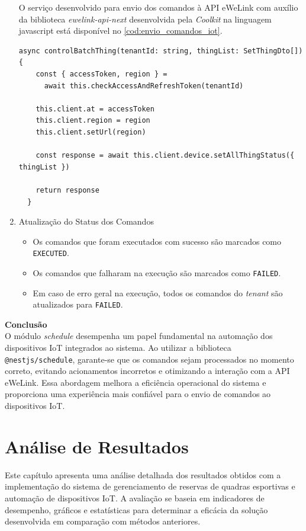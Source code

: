 \begin{enumerate}
  O serviço desenvolvido para envio dos comandos à \acrshort{API} eWeLink com auxílio da biblioteca \textit{ewelink-api-next} desenvolvida pela \textit{Coolkit} na linguagem javascript está disponível no \autoref{cod:envio_comandos_iot}.

  \begin{lstlisting}[caption={Serviço para envio de comandos IoT à \acrshort{API} eWeLink.},label={cod:envio_comandos_iot}]
    async controlBatchThing(tenantId: string, thingList: SetThingDto[]) {
    const { accessToken, region } =
      await this.checkAccessAndRefreshToken(tenantId)

    this.client.at = accessToken
    this.client.region = region
    this.client.setUrl(region)

    const response = await this.client.device.setAllThingStatus({ thingList })

    return response
  }
  \end{lstlisting}
  
  \item Atualização do Status dos Comandos
  \begin{itemize}
      \item Os comandos que foram executados com sucesso são marcados como \texttt{EXECUTED}.
      \item Os comandos que falharam na execução são marcados como \texttt{FAILED}.
      \item Em caso de erro geral na execução, todos os comandos do \textit{tenant} são atualizados para \texttt{FAILED}.
  \end{itemize}
\end{enumerate}

\textbf{Conclusão}\\
O módulo \textit{schedule} desempenha um papel fundamental na automação dos dispositivos IoT integrados ao sistema. Ao utilizar a biblioteca \texttt{@nestjs/schedule}, garante-se que os comandos sejam processados no momento correto, evitando acionamentos incorretos e otimizando a interação com a API eWeLink. Essa abordagem melhora a eficiência operacional do sistema e proporciona uma experiência mais confiável para o envio de comandos ao dispositivos IoT.

\section{Análise de Resultados}\label{sec:analise_resultados}

Este capítulo apresenta uma análise detalhada dos resultados obtidos com a implementação do sistema de gerenciamento de reservas de quadras esportivas e automação de dispositivos IoT. A avaliação se baseia em indicadores de desempenho, gráficos e estatísticas para determinar a eficácia da solução desenvolvida em comparação com métodos anteriores.

